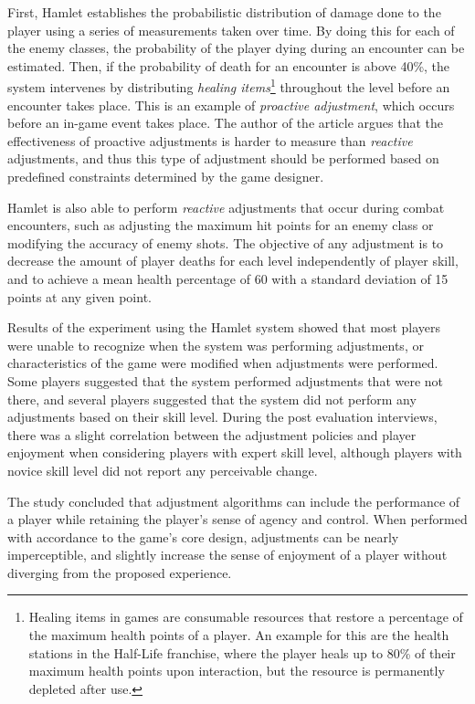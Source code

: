First, Hamlet establishes the probabilistic distribution of damage done to the player using a series of measurements taken over time. By doing this for each of the enemy classes, the probability of the player dying during an encounter can be estimated. Then, if the probability of death for an encounter is above 40\%, the system intervenes by distributing \emph{healing items}\footnote{Healing items in games are consumable resources that restore a percentage of the maximum health points of a player. An example for this are the health stations in the Half-Life franchise, where the player heals up to 80\% of their maximum health points upon interaction, but the resource is permanently depleted after use.} throughout the level before an encounter takes place. This is an example of \emph{proactive adjustment}, which occurs before an in-game event takes place. The author of the article argues that the effectiveness of proactive adjustments is harder to measure than \emph{reactive} adjustments, and thus this type of adjustment should be performed based on predefined constraints determined by the game designer.

Hamlet is also able to perform \emph{reactive} adjustments that occur during combat encounters, such as adjusting the maximum hit points for an enemy class or modifying the accuracy of enemy shots. The objective of any adjustment is to decrease the amount of player deaths for each level independently of player skill, and to achieve a mean health percentage of 60 with a standard deviation of 15 points at any given point.

Results of the experiment using the Hamlet system showed that most players were unable to recognize when the system was performing adjustments, or characteristics of the game were modified when adjustments were performed. Some players suggested that the system performed adjustments that were not there, and several players suggested that the system did not perform any adjustments based on their skill level. During the post evaluation interviews, there was a slight correlation between the adjustment policies and player enjoyment when considering players with expert skill level, although players with novice skill level did not report any perceivable change.

The study concluded that adjustment algorithms can include the performance of a player while retaining the player's sense of agency and control. When performed with accordance to the game's core design, adjustments can be nearly imperceptible, and slightly increase the sense of enjoyment of a player without diverging from the proposed experience.

